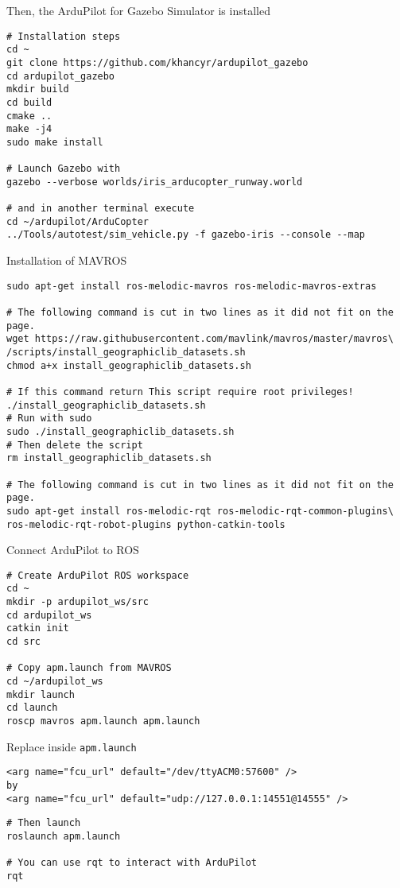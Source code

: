 Then, the ArduPilot for Gazebo Simulator is installed
\begin{verbatim}
# Installation steps
cd ~
git clone https://github.com/khancyr/ardupilot_gazebo
cd ardupilot_gazebo
mkdir build
cd build
cmake ..
make -j4
sudo make install

# Launch Gazebo with
gazebo --verbose worlds/iris_arducopter_runway.world

# and in another terminal execute
cd ~/ardupilot/ArduCopter
../Tools/autotest/sim_vehicle.py -f gazebo-iris --console --map
\end{verbatim}

Installation of MAVROS \cite{ardupilot_install_mavros}
\begin{verbatim}
sudo apt-get install ros-melodic-mavros ros-melodic-mavros-extras

# The following command is cut in two lines as it did not fit on the page.
wget https://raw.githubusercontent.com/mavlink/mavros/master/mavros\
/scripts/install_geographiclib_datasets.sh
chmod a+x install_geographiclib_datasets.sh

# If this command return This script require root privileges!
./install_geographiclib_datasets.sh
# Run with sudo
sudo ./install_geographiclib_datasets.sh
# Then delete the script
rm install_geographiclib_datasets.sh

# The following command is cut in two lines as it did not fit on the page.
sudo apt-get install ros-melodic-rqt ros-melodic-rqt-common-plugins\
ros-melodic-rqt-robot-plugins python-catkin-tools
\end{verbatim}

Connect ArduPilot to ROS \cite{ardupilot_ros_sitl}
\begin{verbatim}
# Create ArduPilot ROS workspace
cd ~
mkdir -p ardupilot_ws/src
cd ardupilot_ws
catkin init
cd src

# Copy apm.launch from MAVROS
cd ~/ardupilot_ws
mkdir launch
cd launch
roscp mavros apm.launch apm.launch
            \end{verbatim}

Replace inside \texttt{apm.launch}
\begin{verbatim}
<arg name="fcu_url" default="/dev/ttyACM0:57600" />
by
<arg name="fcu_url" default="udp://127.0.0.1:14551@14555" />
            \end{verbatim}

\begin{verbatim}
# Then launch
roslaunch apm.launch

# You can use rqt to interact with ArduPilot
rqt
            \end{verbatim}

